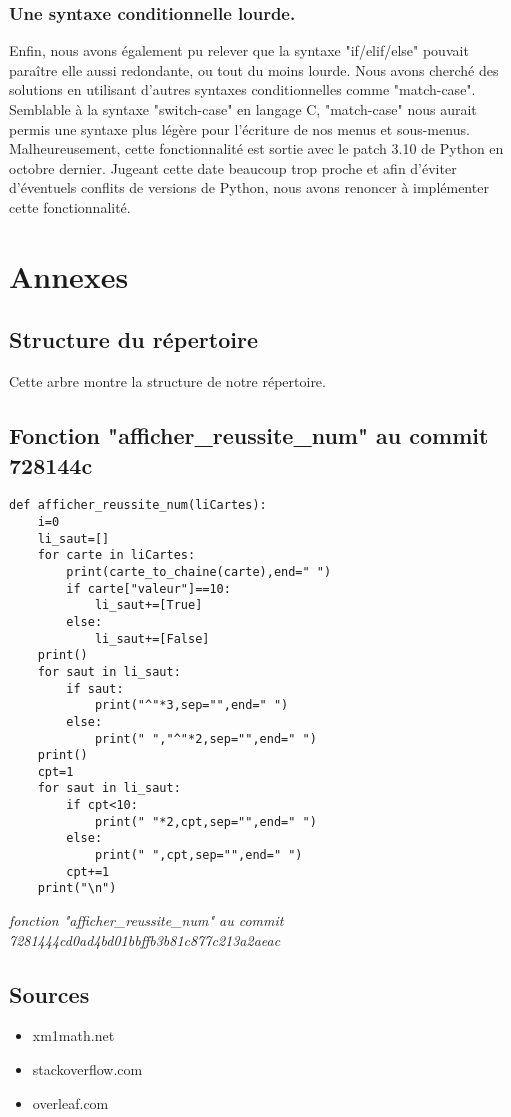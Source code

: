 \documentclass[10pt,a4paper,french,titlepage]{article}
\theoremstyle{definition}
\begin{document}
\subsubsection{Une syntaxe conditionnelle lourde.}
Enfin, nous avons également pu relever que la syntaxe "if/elif/else" pouvait paraître elle aussi redondante, ou tout du moins lourde. Nous avons cherché des solutions en utilisant d'autres syntaxes conditionnelles comme "match-case". Semblable à la syntaxe "switch-case" en langage C, "match-case" nous aurait permis une syntaxe plus légère pour l'écriture de nos menus et sous-menus. Malheureusement, cette fonctionnalité est sortie avec le patch 3.10 de Python en octobre dernier. Jugeant cette date beaucoup trop proche et afin d'éviter d'éventuels conflits de versions de Python, nous avons renoncer à implémenter cette fonctionnalité.
\section{Annexes}
\subsection{Structure du répertoire}\label{arbre}

Cette arbre montre la structure de notre répertoire.\\
\hspace*{\fill}
\begin{center}
%
\end{center}
\hspace*{\fill}
\subsection{Fonction "afficher\_reussite\_num" au commit 728144c}\label{reussite}
\begin{lstlisting}
def afficher_reussite_num(liCartes):
    i=0
    li_saut=[]
    for carte in liCartes:
        print(carte_to_chaine(carte),end=" ")
        if carte["valeur"]==10:
            li_saut+=[True]
        else:
            li_saut+=[False]
    print()
    for saut in li_saut:
        if saut:
            print("^"*3,sep="",end=" ")
        else:
            print(" ","^"*2,sep="",end=" ")
    print()
    cpt=1
    for saut in li_saut:
        if cpt<10:
            print(" "*2,cpt,sep="",end=" ")
        else:
            print(" ",cpt,sep="",end=" ")
        cpt+=1
    print("\n")
\end{lstlisting}
\begin{center}
\textit{fonction "afficher\_reussite\_num" au commit 7281444cd0ad4bd01bbffb3b81c877c213a2aeac}
\end{center}
\subsection{Sources}
\begin{itemize}
\item xm1math.net\\
\item stackoverflow.com\\
\item overleaf.com
\end{itemize}
\end{document}
